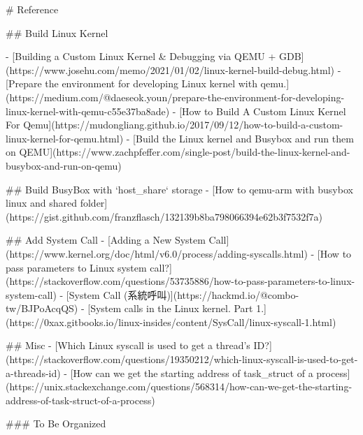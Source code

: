 \documentclass[]{article}
\begin{document}
\begin{markdown}
# Reference

## Build Linux Kernel

- [Building a Custom Linux Kernel & Debugging via QEMU + GDB](https://www.josehu.com/memo/2021/01/02/linux-kernel-build-debug.html)
- [Prepare the environment for developing Linux kernel with qemu.](https://medium.com/@daeseok.youn/prepare-the-environment-for-developing-linux-kernel-with-qemu-c55e37ba8ade)
- [How to Build A Custom Linux Kernel For Qemu](https://mudongliang.github.io/2017/09/12/how-to-build-a-custom-linux-kernel-for-qemu.html)
- [Build the Linux kernel and Busybox and run them on QEMU](https://www.zachpfeffer.com/single-post/build-the-linux-kernel-and-busybox-and-run-on-qemu)

## Build BusyBox with `host_share` storage
- [How to qemu-arm with busybox linux and shared folder](https://gist.github.com/franzflasch/132139b8ba798066394e62b3f7532f7a)

## Add System Call
- [Adding a New System Call](https://www.kernel.org/doc/html/v6.0/process/adding-syscalls.html)
- [How to pass parameters to Linux system call?](https://stackoverflow.com/questions/53735886/how-to-pass-parameters-to-linux-system-call)
- [System Call (系統呼叫)](https://hackmd.io/@combo-tw/BJPoAcqQS)
- [System calls in the Linux kernel. Part 1.](https://0xax.gitbooks.io/linux-insides/content/SysCall/linux-syscall-1.html)

## Misc
- [Which Linux syscall is used to get a thread's ID?](https://stackoverflow.com/questions/19350212/which-linux-syscall-is-used-to-get-a-threads-id)
- [How can we get the starting address of task_struct of a process](https://unix.stackexchange.com/questions/568314/how-can-we-get-the-starting-address-of-task-struct-of-a-process)

### To Be Organized


\end{markdown}
\end{document}
